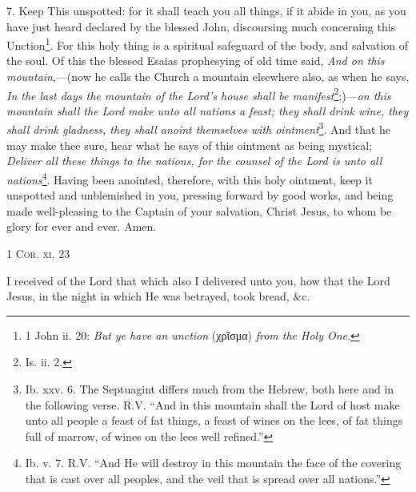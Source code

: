 7. Keep This unspotted: for it shall teach you all things, if it abide in you, as you have just heard declared by the blessed John, discoursing much concerning this Unction\footnote{1 John ii. 20: \emph{But ye have an unction} (\textgreek{χρῖσμα}) \emph{from the Holy One}.}. For this holy thing is a spiritual safeguard of the body, and salvation of the soul. Of this the blessed Esaias prophesying of old time said, \emph{And on this mountain},—(now he calls the Church a mountain elsewhere also, as when he says, \emph{In the last days the mountain of the Lord’s house shall be manifest}\footnote{Is. ii. 2.};)—\emph{on this mountain shall the Lord make unto all nations a feast; they shall drink wine, they shall drink gladness, they shall anoint themselves with ointment}\footnote{Ib. xxv. 6. The Septuagint differs much from the Hebrew, both here and in the following verse. \textsc{R.V.} “And in this mountain shall the Lord of host make unto all people a feast of fat things, a feast of wines on the lees, of fat things full of marrow, of wines on the lees well refined.”}. And that he may make thee sure, hear what he says of this ointment as being mystical; \emph{Deliver all these things to the nations, for the counsel of the Lord is unto all nations}\footnote{Ib. v. 7. R.V. “And He will destroy in this mountain the face of the covering that is cast over all peoples, and the veil that is spread over all nations.”}. Having been anointed, therefore, with this holy ointment, keep it unspotted and unblemished in you, pressing forward by good works, and being made well-pleasing to the Captain of your salvation, Christ Jesus, to whom be glory for ever and ever. Amen.


\textsc{1 Cor. xi. 23}

I received of the Lord that which also I delivered unto you, how that the Lord Jesus, in the night in which He was betrayed, took bread, \&c.

